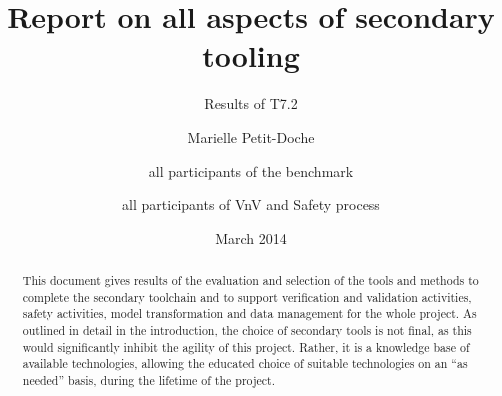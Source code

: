 \documentclass{template/openetcs_report}
\begin{document}
\frontmatter
{}




\title{ Report on all aspects of secondary tooling
}

\subtitle{Results of T7.2}


\date{March 2014}






\author{Marielle Petit-Doche}


\author{all participants of the benchmark}


\author{all participants of VnV  and Safety process}


 


\begin{abstract}
This document gives results of the evaluation and selection of  the tools and methods to complete the secondary toolchain and to support verification and validation activities, safety activities, model transformation and data management for the whole project.  As outlined in detail in the introduction, the choice of secondary tools is not final, as this would significantly inhibit the agility of this project.  Rather, it is a knowledge base of available technologies, allowing the educated choice of suitable technologies on an ``as needed'' basis, during the lifetime of the project.

\end{abstract}
\end{document}
